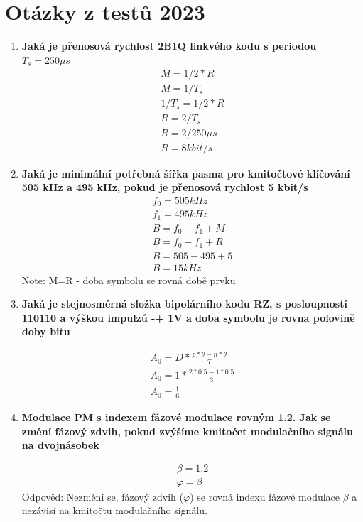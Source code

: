 \section{Otázky z testů 2023}
\begin{enumerate}
    \item \textbf{Jaká je přenosová rychlost 2B1Q linkvého kodu s periodou $T_s=250 \mu s$}
    \begin{align*}
     M=1/2 * R \\
     M= 1/T_s \\
    1/T_s=1/2 * R \\
    R= 2/T_s \\
    R= 2/250\mu s \\
    R= 8kbit/s
    \end{align*}
    \item \textbf{Jaká je minimální potřebná šířka pasma pro kmitočtové klíčování 505 kHz a 495 kHz, pokud je přenosová rychlost 5 kbit/s}
    \begin{align*}
        f_0=505 kHz \\
        f_1=495 kHz \\
        B= f_0 - f_1 + M  \\
        B= f_0 - f_1 + R  \\
        B= 505-495+5 \\
        B=15 kHz  
    \end{align*}
    Note: M=R - doba symbolu se rovná době prvku
    
    \item \textbf{Jaká je stejnosměrná složka bipolárního kodu RZ, s posloupností 110110 a výškou impulzú -+ 1V a doba symbolu je rovna polovině doby bitu}

    
    \begin{align*}
        A_0 = D*\frac{p*\theta-n*\theta}{T} \\
        A_0 = 1 *\frac{2*0.5-1*0.5}{3} \\
        A_0 = \frac{1}{6}
    \end{align*}

    \item \textbf{Modulace PM s indexem fázové modulace rovným 1.2. Jak se změní fázový zdvih, pokud zvýšíme kmitočet modulačního signálu na dvojnásobek}

    \begin{align*}
        \beta= 1.2 \\
        \varphi = \beta
    \end{align*}
    Odpověd: Nezmění se, fázový zdvih ($\varphi$) se rovná indexu fázové modulace $\beta$ a nezávisí na kmitočtu modulačního signálu.


\end{enumerate}
